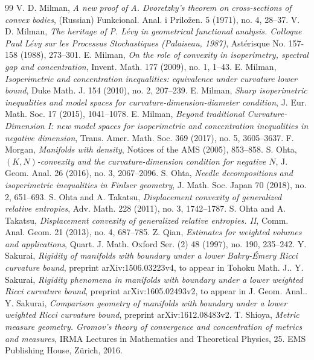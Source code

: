 \documentclass[12pt]{amsart}
\theoremstyle{plain}
\theoremstyle{definition}
\theoremstyle{remark}
\begin{document}
\begin{thebibliography}{99}
  V. D. Milman, \textit{A new proof of A. Dvoretzky's theorem on cross-sections of convex bodies}, (Russian) Funkcional. Anal. i Prilo\v{z}en. 5 (1971), no. 4, 28--37. 
  V. D. Milman, \textit{The heritage of P. L\'evy in geometrical functional analysis. Colloque Paul L\'evy sur les Processus Stochastiques (Palaiseau, 1987)}, Ast\'erisque No. 157-158 (1988), 273--301.
 E. Milman, \textit{On the role of convexity in isoperimetry, spectral gap and concentration}, Invent. Math. 177 (2009), no. 1, 1--43.
 E. Milman, \textit{Isoperimetric and concentration inequalities: equivalence under curvature lower bound}, Duke Math. J. 154 (2010), no. 2, 207--239.
 E. Milman, \textit{Sharp isoperimetric inequalities and model spaces for curvature-dimension-diameter condition}, J. Eur. Math. Soc. 17 (2015), 1041--1078.
 E. Milman, \textit{Beyond traditional Curvature-Dimension I: new model spaces for isoperimetric and concentration inequalities in negative dimension}, Trans. Amer. Math. Soc. 369 (2017), no. 5, 3605--3637.
  F. Morgan, \textit{Manifolds with density}, Notices of the AMS (2005), 853--858.
  S. Ohta, \textit{$(K,N)$-convexity and the curvature-dimension condition for negative $N$}, J. Geom. Anal. 26 (2016), no. 3, 2067--2096.
  S. Ohta, \textit{Needle decompositions and isoperimetric inequalities in Finlser geometry}, J. Math. Soc. Japan 70 (2018), no. 2, 651--693.
  S. Ohta and A. Takatsu, \textit{Displacement convexity of generalized relative entropies}, Adv. Math. 228 (2011), no. 3, 1742--1787.
  S. Ohta and A. Takatsu, \textit{Displacement convexity of generalized relative entropies. I\hspace{-.1em}I}, Comm. Anal. Geom. 21 (2013), no. 4, 687--785.
    Z. Qian, \textit{Estimates for weighted volumes and applications}, Quart. J. Math. Oxford Ser. (2) 48 (1997), no. 190, 235--242.
     Y. Sakurai, \textit{Rigidity of manifolds with boundary under a lower Bakry-\'Emery Ricci curvature bound}, preprint arXiv:1506.03223v4, to appear in Tohoku Math. J..
 Y. Sakurai, \textit{Rigidity phenomena in manifolds with boundary under a lower weighted Ricci curvature bound}, preprint arXiv:1605.02493v2, to appear in J. Geom. Anal..
     Y. Sakurai, \textit{Comparison geometry of manifolds with boundary under a lower weighted Ricci curvature bound}, preprint arXiv:1612.08483v2.
  T. Shioya, \textit{Metric measure geometry. Gromov's theory of convergence and concentration of metrics and measures}, IRMA Lectures in Mathematics and Theoretical Physics, 25. EMS Publishing House, Z\"urich, 2016.

\end{thebibliography}
\end{document}
